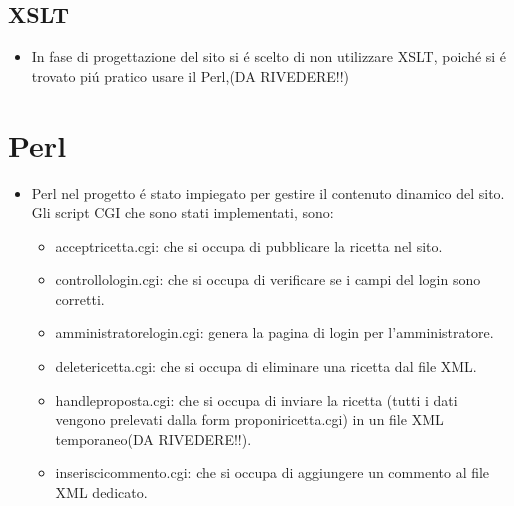 \documentclass[12pt]{article}
\begin{document}
		\subsection{XSLT}
			\begin{itemize}
				\item In fase di progettazione del sito si \'e scelto di non utilizzare XSLT, poich\'e si \'e trovato pi\'u pratico usare il Perl,(DA RIVEDERE!!) 
			\end{itemize}
			
			\section{Perl}
			\begin{itemize}
				\item Perl nel progetto \'e stato impiegato per gestire il contenuto dinamico del sito.
				Gli script CGI che sono stati implementati, sono:
				
				
				\begin{itemize} \item acceptricetta.cgi: che si occupa di pubblicare la ricetta nel sito.
				\end{itemize}
				
				\begin{itemize} \item controllologin.cgi: che si occupa di verificare se i campi del login sono corretti.
				\end{itemize}
				
				\begin{itemize} \item amministratorelogin.cgi: genera la pagina di login per l'amministratore.
				\end{itemize}
				
				\begin{itemize} \item deletericetta.cgi: che si occupa di eliminare una ricetta dal file XML.
				\end{itemize}
				
				\begin{itemize} \item handleproposta.cgi: che si occupa di inviare la ricetta (tutti i dati vengono prelevati dalla form proponiricetta.cgi) in un file XML temporaneo(DA RIVEDERE!!).
				\end{itemize}
				
				\begin{itemize} \item inseriscicommento.cgi: che si occupa di aggiungere un commento al file XML dedicato.
				\end{itemize}
				

\end{itemize}
\end{document}
